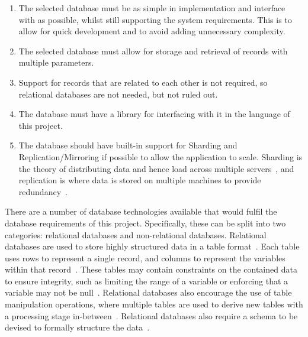 \documentclass[authoryearcitations]{UoYCSproject}
\begin{document}
\begin{enumerate}
  \item The selected database must be as simple in implementation and interface with as possible, whilst still supporting the system requirements.  This is to allow for quick development and to avoid adding unnecessary complexity.
  \item The selected database must allow for storage and retrieval of records with multiple parameters.
  \item Support for records that are related to each other is not required, so relational databases are not needed, but not ruled out.
  \item The database must have a library for interfacing with it in the language of this project.
  \item The database should have built-in support for Sharding and Replication/Mirroring if possible to allow the application to scale. Sharding is the theory of distributing data and hence load across multiple servers~\cite{aboutSharding}, and replication is where data is stored on multiple machines to provide redundancy~\cite{aboutReplication}.
\end{enumerate}

There are a number of database technologies available that would fulfil the database requirements of this project.  Specifically, these can be split into two categories: relational databases and non-relational databases. Relational databases are used to store highly structured data in a table format~\cite{introToDatabaseSys}. Each table uses rows to represent a single record, and columns to represent the variables within that record~\cite{introToDatabaseSys}. These tables may contain constraints on the contained data to ensure integrity, such as limiting the range of a variable or enforcing that a variable may not be null~\cite{introToDatabaseSys}. Relational databases also encourage the use of table manipulation operations, where multiple tables are used to derive new tables with a processing stage in-between~\cite{introToDatabaseSys}. Relational databases also require a schema to be devised to formally structure the data~\cite{Parker:2013:CNM:2498328.2500047}.
\end{document}
